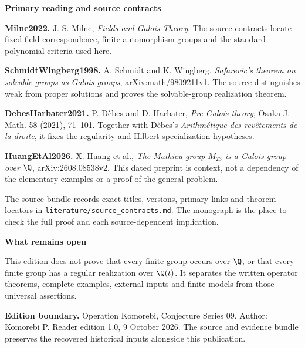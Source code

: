 \documentclass[11pt]{article}
\begin{document}
\begin{minipage}[t]{.475\linewidth}\vspace{0pt}
{\large\bfseries\color{Teal}Primary reading and source contracts}\par
\textbf{Milne2022.} J. S. Milne, \emph{Fields and Galois Theory}. The source contracts locate fixed-field correspondence, finite automorphism groups and the standard polynomial criteria used here.

\textbf{SchmidtWingberg1998.} A. Schmidt and K. Wingberg, \emph{Safarevic's theorem on solvable groups as Galois groups}, arXiv:math/9809211v1. The source distinguishes weak from proper solutions and proves the solvable-group realization theorem.

\textbf{DebesHarbater2021.} P. D\`ebes and D. Harbater, \emph{Pre-Galois theory}, Osaka J. Math. 58 (2021), 71--101. Together with D\`ebes's \emph{Arithm\'etique des rev\^etements de la droite}, it fixes the regularity and Hilbert specialization hypotheses.

\textbf{HuangEtAl2026.} X. Huang et al., \emph{The Mathieu group $M_{23}$ is a Galois group over $\Q$}, arXiv:2608.08538v2. This dated preprint is context, not a dependency of the elementary examples or a proof of the general problem.

The source bundle records exact titles, versions, primary links and theorem locators in \texttt{literature/source\_contracts.md}. The monograph is the place to check the full proof and each source-dependent implication.

{\large\bfseries\color{Teal}What remains open}\par
This edition does not prove that every finite group occurs over $\Q$, or that every finite group has a regular realization over $\Q(t)$. It separates the written operator theorems, complete examples, external inputs and finite models from those universal assertions.
\end{minipage}
\vfill
\colorbox{Soft}{\parbox{\dimexpr\linewidth-2\fboxsep\relax}{\small
\textbf{Edition boundary.} Operation Komorebi, Conjecture Series 09. Author: Komorebi P. Reader edition 1.0, 9 October 2026. The source and evidence bundle preserves the recovered historical inputs alongside this publication.}}
\end{document}
